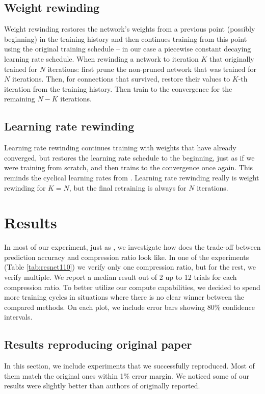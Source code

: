 \subsection{Weight rewinding}
Weight rewinding restores the network's weights from a previous point (possibly beginning) in the training history and then continues training from this point using the original training schedule -- in our case a piecewise constant decaying learning rate schedule.
When rewinding a network to iteration $K$ that originally trained for $N$ iterations: first prune the non-pruned network that was trained for $N$ iterations. Then, for connections that survived, restore their values to $K$-th iteration from the training history. Then train to the convergence for the remaining $N-K$ iterations.

\subsection{Learning rate rewinding}
Learning rate rewinding continues training with weights that have already converged, but restores the learning rate schedule to the beginning, just as if we were training from scratch, and then trains to the convergence once again. This reminds the cyclical learning rates from \cite{cyclical}. Learning rate rewinding really is weight rewinding for $K = N$, but the final retraining is always for $N$ iterations.

\section{Results}
In most of our experiment, just as \cite{Renda}, we investigate how does the trade-off between prediction accuracy and compression ratio look like. 
In one of the experiments (Table \ref{tab:resnet110}) we verify only one compression ratio, but for the rest, we verify multiple.
We report a median result out of 2 up to 12 trials for each compression ratio. To better utilize our compute capabilities, we decided to spend more training cycles in situations where there is no clear winner between the compared methods. On each plot, we include error bars showing 80\% confidence intervals.

\subsection{Results reproducing original paper}

In this section, we include experiments that we successfully reproduced.
Most of them match the original ones within 1\% error margin.
We noticed some of our results were slightly better than authors of \cite{Renda} originally reported.


